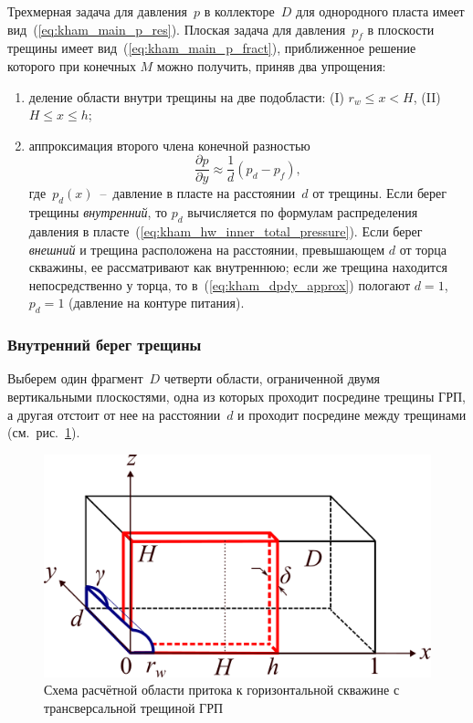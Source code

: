 \documentclass{article}
\begin{document}
Трехмерная задача для давления~$p$ в коллекторе~$D$ для однородного пласта имеет вид~(\ref{eq:kham_main_p_res}).
Плоская задача для давления~$p_f$ в плоскости трещины имеет вид~(\ref{eq:kham_main_p_fract}),
приближенное решение которого при конечных $M$ можно получить, приняв два упрощения:
\begin{enumerate}
	\item деление области внутри трещины на две подобласти: (I) $r_w \leq x < H$, (II) $H \leq x \leq h$;
	\item  аппроксимация второго члена конечной разностью
	      \begin{equation}
		      \displaystyle
		      \dfrac{\partial p}{\partial y} \approx \dfrac{1}{d}\left(p_d - p_f\right),
		      \label{eq:kham_dpdy_approx}
	      \end{equation}
	      где~$p_d(x)$~--~давление в пласте на расстоянии~$d$ от трещины.
	      Если берег трещины \emph{внутренний}, то $p_d$ вычисляется по формулам
	      распределения давления в  пласте~(\ref{eq:kham_hw_inner_total_pressure}). Если берег \emph{внешний} и трещина
	      расположена на расстоянии, превышающем $d$ от торца скважины, ее рассматривают как внутреннюю;
	      если же трещина находится непосредственно у торца, то в~(\ref{eq:kham_dpdy_approx})
	      пологают $d = 1$, $p_d = 1$ (давление на контуре питания).
\end{enumerate}

\subsubsection{Внутренний берег трещины}
Выберем один фрагмент~$D$ четверти области, ограниченной двумя вертикальными плоскостями, одна из которых
проходит посредине трещины ГРП, а другая отстоит от нее на расстоянии~$d$ и проходит посредине между
трещинами (см.~рис.~\ref{fig:kham_fract_inner_scheme}).

\begin{figure}[H]
	\centering
	\includegraphics[width=0.7\linewidth]{images/schemes/kham_fract_inner_scheme.png}
	\caption{Схема расчётной области притока к горизонтальной скважине с трансверсальной трещиной ГРП}
	\label{fig:kham_fract_inner_scheme}
\end{figure}
\end{document}
